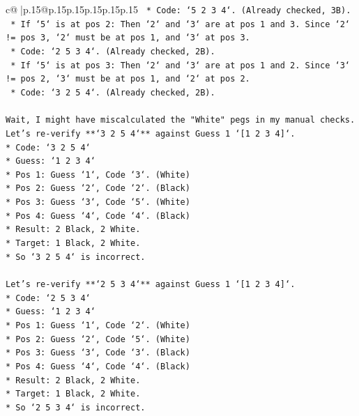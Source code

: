 \documentclass{article}
\begin{document}
{\begin{supertabular}{c@{$\;$}|p{.15\linewidth}@{}p{.15\linewidth}p{.15\linewidth}p{.15\linewidth}p{.15\linewidth}p{.15\linewidth}}
{{{\texttt{        *   Code: `5 2 3 4`. (Already checked, 3B).} \\
\texttt{    *   If `5` is at pos 2: Then `2` and `3` are at pos 1 and 3. Since `2` != pos 3, `2` must be at pos 1, and `3` at pos 3.} \\
\texttt{        *   Code: `2 5 3 4`. (Already checked, 2B).} \\
\texttt{    *   If `5` is at pos 3: Then `2` and `3` are at pos 1 and 2. Since `3` != pos 2, `3` must be at pos 1, and `2` at pos 2.} \\
\texttt{        *   Code: `3 2 5 4`. (Already checked, 2B).} \\
\\ 
\texttt{Wait, I might have miscalculated the "White" pegs in my manual checks. Let's re{-}verify **`3 2 5 4`** against Guess 1 `{[}1 2 3 4{]}`.} \\
\texttt{*   Code: `3 2 5 4`} \\
\texttt{*   Guess: `1 2 3 4`} \\
\texttt{*   Pos 1: Guess `1`, Code `3`. (White)} \\
\texttt{*   Pos 2: Guess `2`, Code `2`. (Black)} \\
\texttt{*   Pos 3: Guess `3`, Code `5`. (White)} \\
\texttt{*   Pos 4: Guess `4`, Code `4`. (Black)} \\
\texttt{*   Result: 2 Black, 2 White.} \\
\texttt{*   Target: 1 Black, 2 White.} \\
\texttt{*   So `3 2 5 4` is incorrect.} \\
\\ 
\texttt{Let's re{-}verify **`2 5 3 4`** against Guess 1 `{[}1 2 3 4{]}`.} \\
\texttt{*   Code: `2 5 3 4`} \\
\texttt{*   Guess: `1 2 3 4`} \\
\texttt{*   Pos 1: Guess `1`, Code `2`. (White)} \\
\texttt{*   Pos 2: Guess `2`, Code `5`. (White)} \\
\texttt{*   Pos 3: Guess `3`, Code `3`. (Black)} \\
\texttt{*   Pos 4: Guess `4`, Code `4`. (Black)} \\
\texttt{*   Result: 2 Black, 2 White.} \\
\texttt{*   Target: 1 Black, 2 White.} \\
\texttt{*   So `2 5 3 4` is incorrect.} \\
\\ 
}}}
\end{supertabular}}
\end{document}
